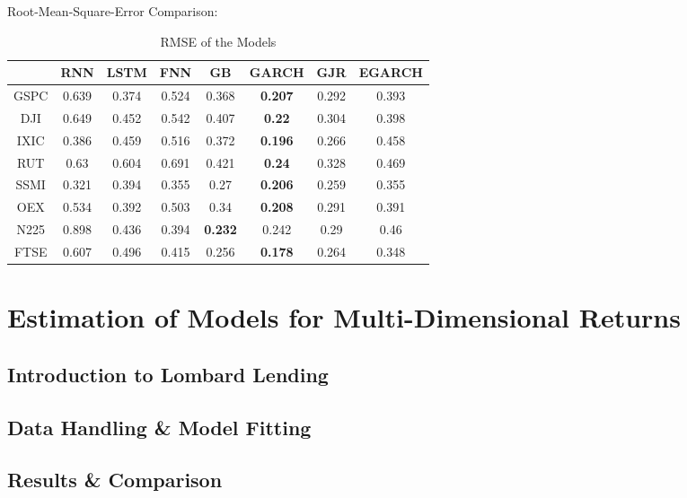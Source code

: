 \documentclass[a4paper, oneside]{discothesis}
\begin{document}
Root-Mean-Square-Error Comparison:

\begin{table}[!hbt]
    \centering
    \begin{tabular}{ |c|||c|c|c|c||c|c|c| } 
    \hline
     & RNN&LSTM&FNN&GB&GARCH&GJR&EGARCH \\
 \hline
GSPC&	0.639&	0.374&	0.524&	0.368&	\textbf{0.207}&	0.292&	0.393\\
DJI	&0.649	&0.452	&0.542	&0.407	&\textbf{0.22}	&0.304	&0.398\\
IXIC&	0.386&	0.459&	0.516&	0.372&	\textbf{0.196}&	0.266&	0.458\\
RUT	&0.63	&0.604	&0.691	&0.421	&\textbf{0.24}	&0.328	&0.469\\
SSMI&	0.321&	0.394&	0.355&	0.27&	\textbf{0.206}&	0.259&	0.355\\
OEX	&0.534	&0.392	&0.503	&0.34	&\textbf{0.208}	&0.291&	0.391\\
N225&	0.898&	0.436&	0.394&	\textbf{0.232}&	0.242&	0.29&	0.46\\
FTSE&	0.607&	0.496&	0.415&	0.256&	\textbf{0.178}&	0.264&	0.348\\
    \hline
    \end{tabular}
    \caption{RMSE of the Models}
\end{table}





\chapter{Estimation of Models for Multi-Dimensional Returns}
\section{Introduction to Lombard Lending}
\section{Data Handling \& Model Fitting}
\section{Results \& Comparison}


\printbibliography
\end{document}
